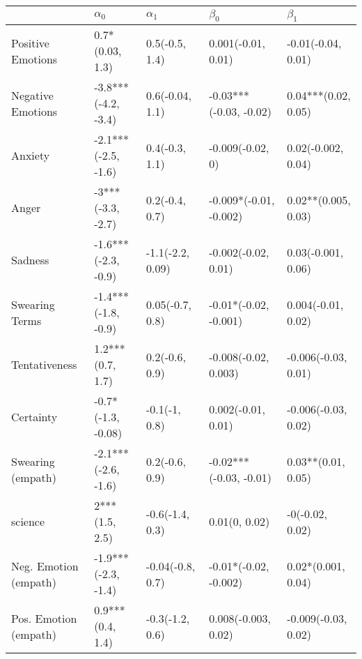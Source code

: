 \begin{tabular}{lllll}
\toprule
{} &           $\alpha_0$ &        $\alpha_1$ &               $\beta_0$ &            $\beta_1$ \\
\midrule
Positive Emotions     &      0.7*(0.03, 1.3) &    0.5(-0.5, 1.4) &      0.001(-0.01, 0.01) &   -0.01(-0.04, 0.01) \\
Negative Emotions     &  -3.8***(-4.2, -3.4) &   0.6(-0.04, 1.1) &  -0.03***(-0.03, -0.02) &  0.04***(0.02, 0.05) \\
Anxiety               &  -2.1***(-2.5, -1.6) &    0.4(-0.3, 1.1) &        -0.009(-0.02, 0) &   0.02(-0.002, 0.04) \\
Anger                 &    -3***(-3.3, -2.7) &    0.2(-0.4, 0.7) &  -0.009*(-0.01, -0.002) &  0.02**(0.005, 0.03) \\
Sadness               &  -1.6***(-2.3, -0.9) &  -1.1(-2.2, 0.09) &     -0.002(-0.02, 0.01) &   0.03(-0.001, 0.06) \\
Swearing Terms        &  -1.4***(-1.8, -0.9) &   0.05(-0.7, 0.8) &   -0.01*(-0.02, -0.001) &   0.004(-0.01, 0.02) \\
Tentativeness         &     1.2***(0.7, 1.7) &    0.2(-0.6, 0.9) &    -0.008(-0.02, 0.003) &  -0.006(-0.03, 0.01) \\
Certainty             &   -0.7*(-1.3, -0.08) &     -0.1(-1, 0.8) &      0.002(-0.01, 0.01) &  -0.006(-0.03, 0.02) \\
Swearing (empath)     &  -2.1***(-2.6, -1.6) &    0.2(-0.6, 0.9) &  -0.02***(-0.03, -0.01) &   0.03**(0.01, 0.05) \\
science               &       2***(1.5, 2.5) &   -0.6(-1.4, 0.3) &           0.01(0, 0.02) &      -0(-0.02, 0.02) \\
Neg. Emotion (empath) &  -1.9***(-2.3, -1.4) &  -0.04(-0.8, 0.7) &   -0.01*(-0.02, -0.002) &   0.02*(0.001, 0.04) \\
Pos. Emotion (empath) &     0.9***(0.4, 1.4) &   -0.3(-1.2, 0.6) &     0.008(-0.003, 0.02) &  -0.009(-0.03, 0.02) \\
\bottomrule
\end{tabular}
